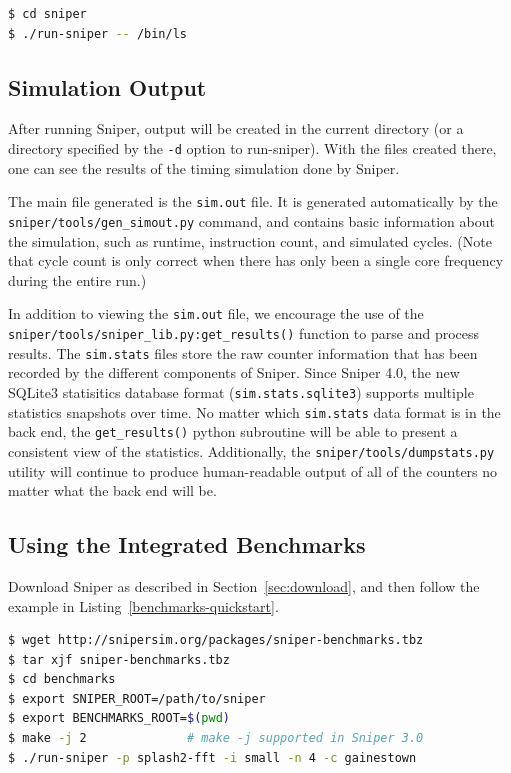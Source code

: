 \documentclass[a4paper,11pt,titlepage]{article}
\newcommand{\sourcecode}[1]{{\tt #1}}
\newcommand{\cmd}[1]{{\tt #1}}
\begin{document}
\begin{lstlisting}[label=benchmarks-quickstart,caption=Integrated Benchmarks Quickstart,rulecolor=\color{DarkSlateBlue},language=Bash]
$ cd sniper
$ ./run-sniper -- /bin/ls
\end{lstlisting}

\subsection{Simulation Output}

After running Sniper, output will be created in the current directory (or a directory specified
by the \cmd{-d} option to run-sniper).  With the files created there, one can see the results
of the timing simulation done by Sniper.

The main file generated is the \cmd{sim.out} file.  It is generated automatically by the
\sourcecode{sniper/tools/gen\_simout.py} command, and contains basic information about the simulation,
such as runtime, instruction count, and simulated cycles. (Note that cycle count is only correct
when there has only been a single core frequency during the entire run.)

In addition to viewing the \cmd{sim.out} file, we encourage the use of the \sourcecode{sniper/tools/sniper\_lib.py:get\_results()} function to parse and process results.
The \cmd{sim.stats} files store the raw counter information that
has been recorded by the different components of Sniper.
Since Sniper 4.0, the new SQLite3 statisitics database format (\cmd{sim.stats.sqlite3}) supports
multiple statistics snapshots over time.
No matter which \cmd{sim.stats} data format is in the back end, the \sourcecode{get\_results()}
python subroutine will be able to present a consistent view of the statistics.  Additionally, the
\cmd{sniper/tools/dumpstats.py} utility will continue to produce human-readable output
of all of the counters no matter what the back end will be.

\subsection{Using the Integrated Benchmarks}
\label{sec:integrated-benchmarks}

Download Sniper as described in Section~\ref{sec:download}, and then follow the example in Listing~\ref{benchmarks-quickstart}.

\begin{lstlisting}[label=benchmarks-quickstart,caption=Integrated Benchmarks Quickstart,rulecolor=\color{DarkSlateBlue},language=Bash]
$ wget http://snipersim.org/packages/sniper-benchmarks.tbz
$ tar xjf sniper-benchmarks.tbz
$ cd benchmarks
$ export SNIPER_ROOT=/path/to/sniper
$ export BENCHMARKS_ROOT=$(pwd)
$ make -j 2              # make -j supported in Sniper 3.0
$ ./run-sniper -p splash2-fft -i small -n 4 -c gainestown
\end{lstlisting}
\end{document}
